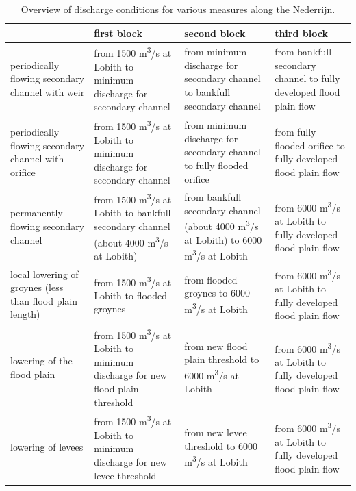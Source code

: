 \begin{table}
\begin{tabular}{p{}|p{}|p{}|p{}}
 & first block & second block & third block \\ \hline
periodically flowing secondary channel with weir & from 1500 m\textsuperscript{3}/s at Lobith to minimum discharge for secondary channel & from minimum discharge for secondary channel to bankfull secondary channel & from bankfull secondary channel to fully developed flood plain flow \\ \hline
periodically flowing secondary channel with orifice & from 1500 m\textsuperscript{3}/s at Lobith to minimum discharge for secondary channel & from minimum discharge for secondary channel to fully flooded orifice & from fully flooded orifice to fully developed flood plain flow \\ \hline
permanently flowing secondary channel & from 1500 m\textsuperscript{3}/s at Lobith to bankfull secondary channel (about 4000 m\textsuperscript{3}/s at Lobith) & from bankfull secondary channel (about 4000 m\textsuperscript{3}/s at Lobith) to 6000 m\textsuperscript{3}/s at Lobith & from 6000 m\textsuperscript{3}/s at Lobith to fully developed flood plain flow \\ \hline
local lowering of groynes (less than flood plain length) & from 1500 m\textsuperscript{3}/s at Lobith to flooded groynes & from flooded groynes to 6000 m\textsuperscript{3}/s at Lobith & from 6000 m\textsuperscript{3}/s at Lobith to fully developed flood plain flow \\ \hline
lowering of the flood plain & from 1500 m\textsuperscript{3}/s at Lobith to minimum discharge for new flood plain threshold & from new flood plain threshold to 6000 m\textsuperscript{3}/s at Lobith & from 6000 m\textsuperscript{3}/s at Lobith to fully developed flood plain flow \\ \hline
lowering of levees & from 1500 m\textsuperscript{3}/s at Lobith to minimum discharge for new levee threshold & from new levee threshold to 6000 m\textsuperscript{3}/s at Lobith & from 6000 m\textsuperscript{3}/s at Lobith to fully developed flood plain flow \\
\end{tabular}

\caption{Overview of discharge conditions for various measures along the Nederrijn.}
\label{Tab2}
\end{table}

